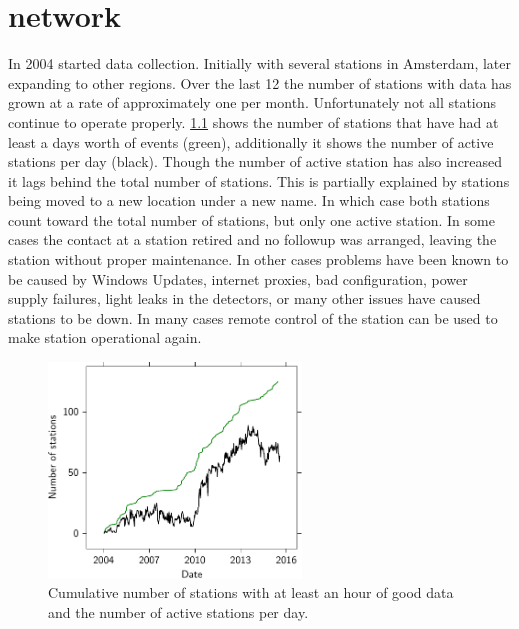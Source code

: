 \chapter{\hisparc network}
\label{ch:cluster}


In 2004 \hisparc started data collection. Initially with several stations in Amsterdam, later expanding to other regions. Over the last \SI{12}{\year} the number of stations with data has grown at a rate of approximately one per month. Unfortunately not all stations continue to operate properly. \cref{fig:active_stations} shows the number of stations that have had at least a days worth of events (green), additionally it shows the number of active stations per day (black). Though the number of active station has also increased it lags behind the total number of stations. This is partially explained by stations being moved to a new location under a new name. In which case both stations count toward the total number of stations, but only one active station. In some cases the contact at a station retired and no followup was arranged, leaving the station without proper maintenance. In other cases problems have been known to be caused by Windows Updates, internet proxies, bad configuration, power supply failures, light leaks in the detectors, or many other issues have caused stations to be down. In many cases remote control of the station can be used to make station operational again.

\begin{figure}
    \centering
    \includegraphics[width=0.6\textwidth]
                    {plots/cluster/active_stations}
    \caption{Cumulative number of stations with at least an hour of good data and the number of active stations per day.}
    \label{fig:active_stations}
\end{figure}

